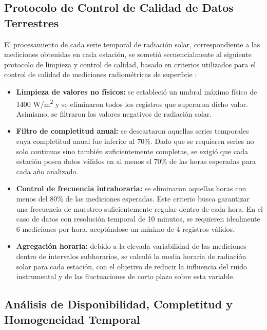 \documentclass[../main.tex]{subfiles}
\begin{document}
\subsection{Protocolo de Control de Calidad de Datos Terrestres}

El procesamiento de cada serie temporal de radiación solar, correspondiente a las mediciones obtenidas en cada estación, se sometió secuencialmente al siguiente protocolo de limpieza y control de calidad, basado en criterios utilizados para el control de calidad de mediciones radiométricas de superficie \cite{long_dutton_2002,long_shi_2008}:

\begin{itemize}

    \item \textbf{Limpieza de valores no físicos:} se estableció un umbral máximo físico de 1400 W/m\textsuperscript{2} y se eliminaron todos los registros que superaron dicho valor. Asimismo, se filtraron los valores negativos de radiación solar.

    \item \textbf{Filtro de completitud anual:} se descartaron aquellas series temporales cuya completitud anual fue inferior al 70\%. Dado que se requieren series no solo continuas sino también suficientemente completas, se exigió que cada estación posea datos válidos en al menos el 70\% de las horas esperadas para cada año analizado.

    \item \textbf{Control de frecuencia intrahoraria:} se eliminaron aquellas horas con menos del 80\% de las mediciones esperadas. Este criterio busca garantizar una frecuencia de muestreo suficientemente regular dentro de cada hora. En el caso de datos con resolución temporal de 10 minutos, se requieren idealmente 6 mediciones por hora, aceptándose un mínimo de 4 registros válidos.

    \item \textbf{Agregación horaria:} debido a la elevada variabilidad de las mediciones dentro de intervalos subhorarios, se calculó la media horaria de radiación solar para cada estación, con el objetivo de reducir la influencia del ruido instrumental y de las fluctuaciones de corto plazo sobre esta variable.

\end{itemize}

\subsection{Análisis de Disponibilidad, Completitud y Homogeneidad Temporal}
\end{document}
